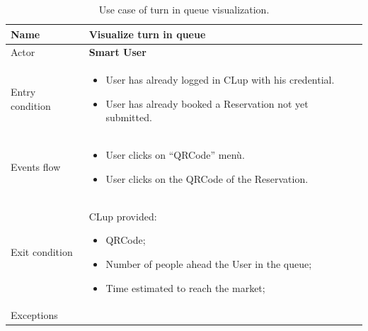 \begin{table}[H]\begin{tabular}{|p{5cm} | p{7cm} | }
	\hline
	Name & \textbf{Visualize turn in queue} \\
	\hline
	Actor & \textbf{Smart User} \\
	\hline
	Entry condition &
	\begin{itemize}
	    \item User has already logged in CLup with his credential. 
		\item User has already booked a Reservation not yet submitted.
        \end{itemize}\\
	\hline
	Events flow & 
	\begin{itemize}
	\item User clicks on “QRCode” menù.
    \item User clicks on the QRCode of the Reservation.
    \end{itemize} \\
	\hline
	Exit condition & CLup provided:
    \begin{itemize}
    \item QRCode;
    \item Number of people ahead the User in the queue;
    \item Time estimated to reach the market;
    \end{itemize} \\
	\hline 
	Exceptions & \\
	\hline
\end{tabular}
\caption{Use case of turn in queue visualization.}
\end{table}

\bigbreak

